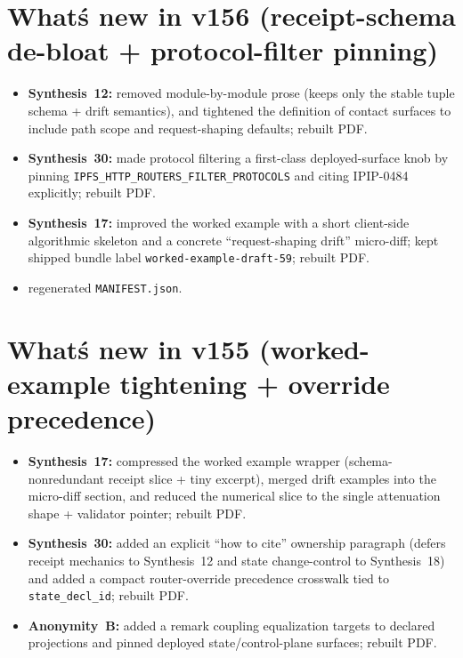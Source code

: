 \documentclass[11pt]{article}
\begin{document}
\section{What\'s new in v156 (receipt-schema de-bloat + protocol-filter pinning)}
\begin{itemize}[leftmargin=*]
\item \textbf{Synthesis~12:} removed module-by-module prose (keeps only the stable tuple schema + drift semantics), and tightened the definition of contact surfaces to include path scope and request-shaping defaults; rebuilt PDF.
\item \textbf{Synthesis~30:} made protocol filtering a first-class deployed-surface knob by pinning \texttt{IPFS\_HTTP\_ROUTERS\_FILTER\_PROTOCOLS} and citing IPIP-0484 explicitly; rebuilt PDF.
\item \textbf{Synthesis~17:} improved the worked example with a short client-side algorithmic skeleton and a concrete ``request-shaping drift'' micro-diff; kept shipped bundle label \texttt{worked-example-draft-59}; rebuilt PDF.
\item regenerated \texttt{MANIFEST.json}.
\end{itemize}

\section{What\'s new in v155 (worked-example tightening + override precedence)}
\begin{itemize}[leftmargin=*]
\item \textbf{Synthesis~17:} compressed the worked example wrapper (schema-nonredundant receipt slice + tiny excerpt), merged drift examples into the micro-diff section, and reduced the numerical slice to the single attenuation shape + validator pointer; rebuilt PDF.
\item \textbf{Synthesis~30:} added an explicit ``how to cite'' ownership paragraph (defers receipt mechanics to Synthesis~12 and state change-control to Synthesis~18) and added a compact router-override precedence crosswalk tied to \texttt{state\_decl\_id}; rebuilt PDF.
\item \textbf{Anonymity~B:} added a remark coupling equalization targets to declared projections and pinned deployed state/control-plane surfaces; rebuilt PDF.
\end{itemize}
\end{document}
